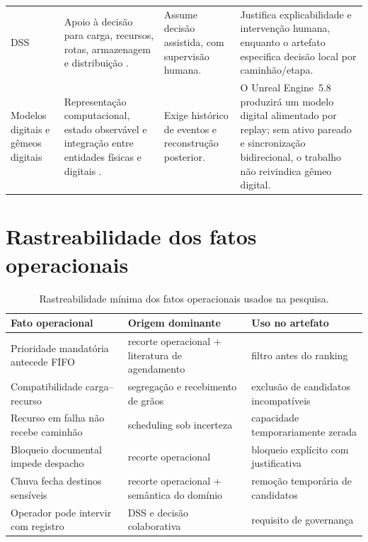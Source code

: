 \documentclass[
  12pt,
  oneside,
  a4paper,
  sumario=tradicional,
  brazil
]{abntex2}
\begin{document}
\begin{apendicesenv}
{\begin{longtable}{@{}P{0.18\textwidth}P{0.23\textwidth}P{0.24\textwidth}P{0.25\textwidth}@{}}
\addlinespace
DSS & Apoio \`a decis\~ao para carga, recursos, rotas, armazenagem e distribui\c{c}\~ao \parencite{vanderheydenDecisionSupportSystem1985a, hillDecisionSupportSystem2017aa, mardanehDecisionSupportSystem2021a}. & Assume decis\~ao assistida, com supervis\~ao humana. & Justifica explicabilidade e interven\c{c}\~ao humana, enquanto o artefato especifica decis\~ao local por caminh\~ao/etapa. \\
\addlinespace
Modelos digitais e g\^emeos digitais & Representa\c{c}\~ao computacional, estado observ\'avel e integra\c{c}\~ao entre entidades f\'isicas e digitais \parencite{kritzingerDigitalTwinManufacturing2018,dyckDigitalTwinsNovel2023,nistDigitalTwinsEssentialElements2026}. & Exige hist\'orico de eventos e reconstru\c{c}\~ao posterior. & O Unreal Engine~5.8 produzir\'a um modelo digital alimentado por replay; sem ativo pareado e sincroniza\c{c}\~ao bidirecional, o trabalho n\~ao reivindica g\^emeo digital. \\
\bottomrule
\end{longtable}
}

\section{Rastreabilidade dos fatos operacionais}

\begin{table}[H]
\centering
\small
\setlength{\tabcolsep}{6pt}
\renewcommand{\arraystretch}{1.18}
\begin{tabularx}{\textwidth}{@{}P{0.27\textwidth}P{0.31\textwidth}Y@{}}
\toprule
{}
\textbf{Fato operacional} & \textbf{Origem dominante} & \textbf{Uso no artefato} \\
\midrule
Prioridade mandat\'oria antecede FIFO & recorte operacional + literatura de agendamento & filtro antes do ranking \\
\addlinespace
Compatibilidade carga--recurso & segrega\c{c}\~ao e recebimento de gr\~aos & exclus\~ao de candidatos incompat\'iveis \\
\addlinespace
Recurso em falha n\~ao recebe caminh\~ao & scheduling sob incerteza & capacidade temporariamente zerada \\
\addlinespace
Bloqueio documental impede despacho & recorte operacional & bloqueio expl\'icito com justificativa \\
\addlinespace
Chuva fecha destinos sens\'iveis & recorte operacional + sem\^antica do dom\'inio & remo\c{c}\~ao tempor\'aria de candidatos \\
\addlinespace
Operador pode intervir com registro & DSS e decis\~ao colaborativa & requisito de governan\c{c}a \\
\bottomrule
\end{tabularx}
\caption[Rastreabilidade dos fatos operacionais]{Rastreabilidade m\'inima dos fatos operacionais usados na pesquisa.}
\label{tab:rastreabilidade-fatos}
\end{table}


\end{apendicesenv}
\end{document}
